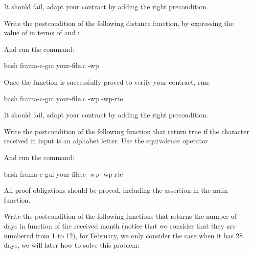 It should fail, adapt your contract by adding the right precondition.




Write the postcondition of the following distance function, by expressing
the value of  in terms of  and
:




And run the command:


\begin{CodeBlock}{bash}
frama-c-gui your-file.c -wp
\end{CodeBlock}


Once the function is successfully proved to verify your contract, run:


\begin{CodeBlock}{bash}
frama-c-gui your-file.c -wp -wp-rte
\end{CodeBlock}


It should fail, adapt your contract by adding the right precondition.






Write the postcondition of the following function that return true if
the character received in input is an alphabet letter. Use the equivalence
operator \CodeInline{<==>}.





And run the command:


\begin{CodeBlock}{bash}
frama-c-gui your-file.c -wp -wp-rte
\end{CodeBlock}


All proof obligations should be proved, including the assertion in the
main function.






Write the postcondition of the following functions that returns the number
of days in function of the received month (notice that we consider that
they are numbered from 1 to 12), for February, we only consider the case
when it has 28 days, we will later how to solve this problem:





